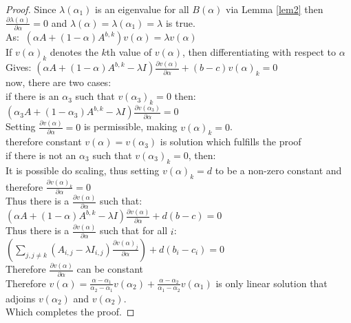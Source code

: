 \begin{proof}
Since $\lambda(\alpha_1)$ is an eigenvalue for all $B(\alpha)$ via Lemma \ref{lem2} then $\frac{\partial \lambda(\alpha)}{\partial \alpha}=0$ and $\lambda(\alpha)=\lambda(\alpha_1)=\lambda$ is true.\\
As: $~\left(\alpha A + (1-\alpha)A^{b,k}\right)v(\alpha)=\lambda v(\alpha)$\\
If $v(\alpha)_k$ denotes the $k$th value of $v(\alpha)$, then differentiating with respect to $\alpha$ \\
Gives: $\left(\alpha A + (1-\alpha)A^{b,k} - \lambda I\right)\frac{\partial v(\alpha)}{\partial\alpha}+(b-c)v(\alpha)_k=0$\\
now, there are two cases:\\
if there is an $\alpha_3$ such that $v(\alpha_3)_k=0$ then:\\
\-\hspace{8mm}$\left(\alpha_3 A + (1-\alpha_3)A^{b,k} - \lambda I\right)\frac{\partial v(\alpha_3)}{\partial\alpha}=0$\\
\-\hspace{8mm}Setting $\frac{\partial v(\alpha)}{\partial\alpha}=0$ is permissible, making $v(\alpha)_k=0$.\\
\-\hspace{8mm}therefore constant $v(\alpha)=v(\alpha_3)$ is solution which fulfills the proof\\
if there is not an $\alpha_3$ such that $v(\alpha_3)_k=0$, then:\\
\-\hspace{8mm}It is possible do scaling, thus setting $v(\alpha)_k=d$ to be a non-zero constant and therefore $\frac{\partial v(\alpha)_k}{\partial \alpha}=0$\\
\-\hspace{8mm}Thus there is a $\frac{\partial v(\alpha)}{\partial\alpha}$ such that: $\left(\alpha A + (1-\alpha)A^{b,k} - \lambda I\right)\frac{\partial v(\alpha)}{\partial\alpha}+d(b-c)=0$\\
\-\hspace{8mm}Thus there is a $\frac{\partial v(\alpha)}{\partial\alpha}$ such that for all $i$: $\left(\sum_{j,j\ne k}\left(A_{i,j}-\lambda I_{i,j}\right)\frac{\partial v(\alpha)_j}{\partial\alpha}\right) +d(b_i-c_i)=0 $\\
\-\hspace{8mm}Therefore $\frac{\partial v(\alpha)}{\partial\alpha}$ can be constant\\
\-\hspace{8mm}Therefore $v(\alpha)=\frac{\alpha-\alpha_1}{\alpha_2-\alpha_1}v(\alpha_2)+\frac{\alpha-\alpha_2}{\alpha_1-\alpha_2}v(\alpha_1)$ is only linear solution that adjoins $v(\alpha_2)$ and $v(\alpha_2)$.\\
Which completes the proof.
\end{proof}

